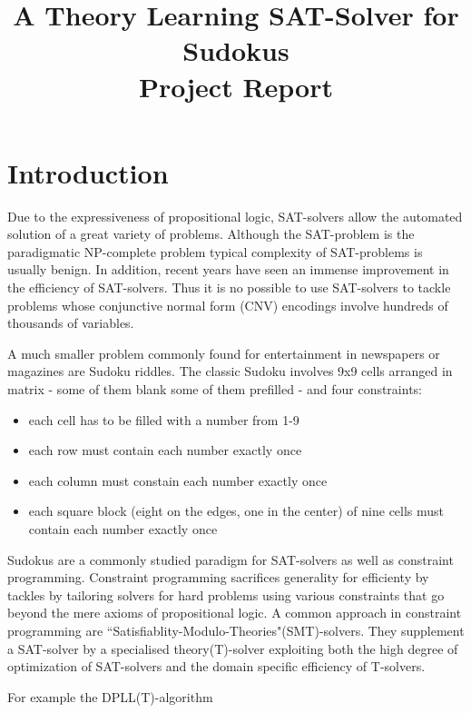 \documentclass{article}
\begin{document}
\title{A Theory Learning SAT-Solver for Sudokus\\
	\large Project Report}
\maketitle


\section{Introduction}

Due to the expressiveness of propositional logic, SAT-solvers allow the automated solution of a great variety of problems. Although the SAT-problem is the paradigmatic NP-complete problem typical complexity of SAT-problems is usually benign. In addition, recent years have seen an immense improvement in the efficiency of SAT-solvers. Thus it is no possible to use SAT-solvers to tackle problems whose conjunctive normal form (CNV) encodings involve hundreds of thousands of variables.

A much smaller problem commonly found for entertainment in newspapers or magazines are Sudoku riddles. The classic Sudoku involves 9x9 cells arranged in matrix - some of them blank some of them prefilled - and four constraints:

\begin{itemize}
	\item each cell has to be filled with a number from 1-9
	\item each row must contain each number exactly once
	\item each column must constain each number exactly once
	\item each square block (eight on the edges, one in the center) of nine cells must contain each number exactly once
\end{itemize}

Sudokus are a commonly studied paradigm for SAT-solvers as well as constraint programming. Constraint programming sacrifices generality for efficienty by tackles by tailoring solvers for hard problems using various constraints that go beyond the mere axioms of propositional logic. A common approach in constraint programming are ``Satisfiablity-Modulo-Theories"(SMT)-solvers. They supplement a SAT-solver by a specialised theory(T)-solver exploiting both the high degree of optimization of SAT-solvers and the domain specific efficiency of T-solvers. 

For example the DPLL(T)-algorithm
\end{document}
